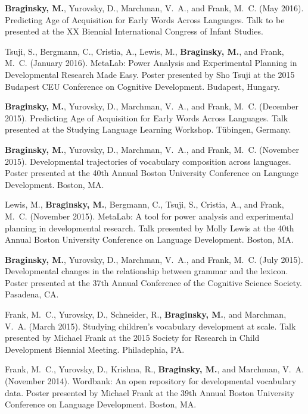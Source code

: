 \documentclass[11pt,letter]{moderncv}
\begin{document}
\begin{small}
\begin{thebibliography}{}

\textbf{Braginsky, M.}, Yurovsky, D., Marchman, V.~A., and Frank, M.~C. (May 2016).
\newblock Predicting Age of Acquisition for Early Words Across Languages.
\newblock Talk to be presented at the XX Biennial International Congress of Infant Studies.
  
Tsuji, S., Bergmann, C., Cristia, A., Lewis, M., \textbf{Braginsky, M.}, and Frank, M.~C. (January 2016).
\newblock MetaLab: Power Analysis and Experimental Planning in Developmental Research Made Easy.
\newblock Poster presented by Sho Tsuji at the 2015 Budapest CEU Conference on Cognitive Development.
  Budapest, Hungary.

\textbf{Braginsky, M.}, Yurovsky, D., Marchman, V.~A., and Frank, M.~C. (December 2015).
\newblock Predicting Age of Acquisition for Early Words Across Languages.
\newblock Talk presented at the Studying Language Learning Workshop.
  T{\"u}bingen, Germany.
  
\textbf{Braginsky, M.}, Yurovsky, D., Marchman, V.~A., and Frank, M.~C. (November 2015).
\newblock Developmental trajectories of vocabulary composition across languages.
\newblock Poster presented at the 40th Annual Boston University
  Conference on Language Development.
  Boston, MA.
  
Lewis, M., \textbf{Braginsky, M.}, Bergmann, C., Tsuji, S., Cristia, A., and Frank, M.~C. (November 2015).
\newblock MetaLab: A tool for power analysis and experimental planning in developmental research.
\newblock Talk presented by Molly Lewis at the 40th Annual Boston University
  Conference on Language Development.
  Boston, MA.
  
\textbf{Braginsky, M.}, Yurovsky, D., Marchman, V.~A., and Frank, M.~C. (July 2015).
\newblock Developmental changes in the relationship between grammar and the
  lexicon.
\newblock Poster presented at the 37th Annual Conference of the Cognitive Science Society.
  Pasadena, CA.

Frank, M.~C., Yurovsky, D., Schneider, R., \textbf{Braginsky, M.}, and Marchman, V.~A. (March 2015).
\newblock Studying children's vocabulary development at scale.
\newblock Talk presented by Michael Frank at the 2015 Society for Research in Child
  Development Biennial Meeting.
  Philadephia, PA.

Frank, M.~C., Yurovsky, D., Krishna, R., \textbf{Braginsky, M.}, and Marchman, V.~A. (November 2014).
\newblock Wordbank: An open repository for developmental vocabulary data.
\newblock Poster presented by Michael Frank at the 39th Annual Boston University
  Conference on Language Development.
  Boston, MA.
 
\end{thebibliography}
\end{small}
\end{document}
